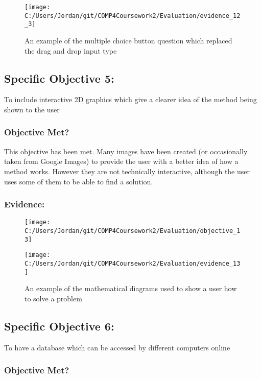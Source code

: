 \begin{figure}[H]
	\texttt{[image: C:/Users/Jordan/git/COMP4Coursework2/Evaluation/evidence\_12\_3]}
	\caption{An example of the multiple choice button question which replaced the drag and drop input type}
\end{figure}

\subsection{Specific Objective 5: }

To include interactive 2D graphics which give a clearer idea of the method being shown to the user

\subsubsection{Objective Met?}

This objective has been met. Many images have been created (or occasionally taken from Google Images) to provide the user with a better idea of how a method works. However they are not technically interactive, although the user uses some of them to be able to find a solution.

\subsubsection{Evidence: }

\begin{figure}[H]
	\texttt{[image: C:/Users/Jordan/git/COMP4Coursework2/Evaluation/objective\_13]}
\end{figure}

\begin{figure}[H]
	\texttt{[image: C:/Users/Jordan/git/COMP4Coursework2/Evaluation/evidence\_13]}
	\caption{An example of the mathematical diagrams used to show a user how to solve a problem}
\end{figure}

\subsection{Specific Objective 6: }

To have a database which can be accessed by different computers online

\subsubsection{Objective Met?}

